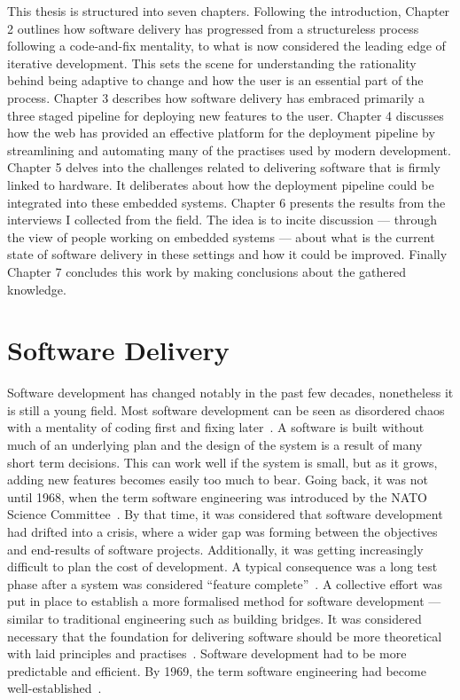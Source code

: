 \documentclass[english]{tktltiki2}
\begin{document}
This thesis is structured into seven chapters. Following the introduction, Chapter 2 outlines how software delivery has progressed from a structureless process following a code-and-fix mentality, to what is now considered the leading edge of iterative development. This sets the scene for understanding the rationality behind being adaptive to change and how the user is an essential part of the process. Chapter 3 describes how software delivery has embraced primarily a three staged pipeline for deploying new features to the user. Chapter 4 discusses how the web has provided an effective platform for the deployment pipeline by streamlining and automating many of the practises used by modern development. Chapter 5 delves into the challenges related to delivering software that is firmly linked to hardware. It deliberates about how the deployment pipeline could be integrated into these embedded systems. Chapter 6 presents the results from the interviews I collected from the field. The idea is to incite discussion — through the view of people working on embedded systems — about what is the current state of software delivery in these settings and how it could be improved. Finally Chapter 7 concludes this work by making conclusions about the gathered knowledge.


\section{Software Delivery}

Software development has changed notably in the past few decades, nonetheless it is still a young field. Most software development can be seen as disordered chaos with a mentality of coding first and fixing later~\cite{Boe88, Fow05}. A software is built without much of an underlying plan and the design of the system is a result of many short term decisions. This can work well if the system is small, but as it grows, adding new features becomes easily too much to bear. Going back, it was not until 1968, when the term software engineering was introduced by the NATO Science Committee~\cite{NR69}. By that time, it was considered that software development had drifted into a crisis, where a wider gap was forming between the objectives and end-results of software projects. Additionally, it was getting increasingly difficult to plan the cost of development. A typical consequence was a long test phase after a system was considered “feature complete”~\cite{Fow05}. A collective effort was put in place to establish a more formalised method for software development — similar to traditional engineering such as building bridges. It was considered necessary that the foundation for delivering software should be more theoretical with laid principles and practises~\cite{NR69}. Software development had to be more predictable and efficient. By 1969, the term software engineering had become well-established~\cite{BR70}.
\end{document}
